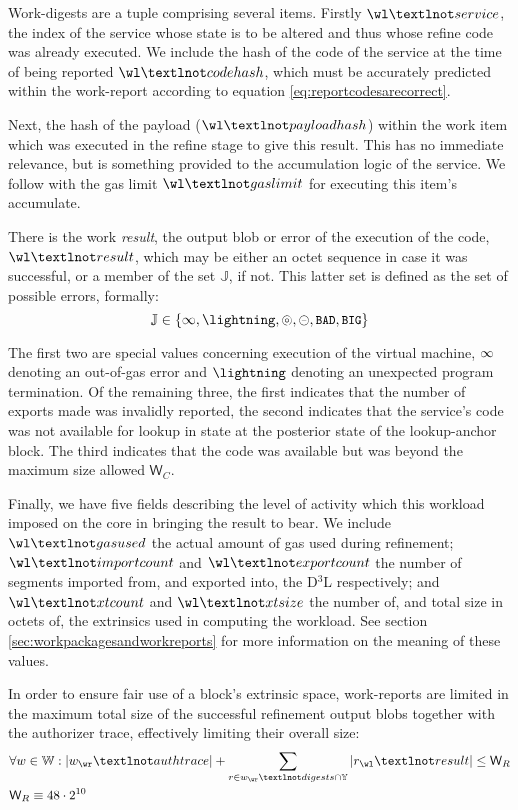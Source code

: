 Work-digests are a tuple comprising several items. Firstly $\wl¬service$, the index of the service whose state is to be altered and thus whose refine code was already executed. We include the hash of the code of the service at the time of being reported $\wl¬codehash$, which must be accurately predicted within the work-report according to equation \ref{eq:reportcodesarecorrect}.

Next, the hash of the payload ($\wl¬payloadhash$) within the work item which was executed in the refine stage to give this result. This has no immediate relevance, but is something provided to the accumulation logic of the service. We follow with the gas limit $\wl¬gaslimit$ for executing this item's accumulate.

There is the work \emph{result}, the output blob or error of the execution of the code, $\wl¬result$, which may be either an octet sequence in case it was successful, or a member of the set $\mathbb{J}$, if not. This latter set is defined as the set of possible errors, formally:
\begin{equation}
  \mathbb{J} \in \{ \oog, \panic, \badexports, \oversize, \token{BAD}, \token{BIG} \}
\end{equation}

The first two are special values concerning execution of the virtual machine, $\infty$ denoting an out-of-gas error and $\panic$ denoting an unexpected program termination. Of the remaining three, the first indicates that the number of exports made was invalidly reported, the second indicates that the service's code was not available for lookup in state at the posterior state of the lookup-anchor block. The third indicates that the code was available but was beyond the maximum size allowed $\mathsf{W}_C$.

Finally, we have five fields describing the level of activity which this workload imposed on the core in bringing the result to bear. We include $\wl¬gasused$ the actual amount of gas used during refinement; $\wl¬importcount$ and $\wl¬exportcount$ the number of segments imported from, and exported into, the D$^3$L respectively; and $\wl¬xtcount$ and $\wl¬xtsize$ the number of, and total size in octets of, the extrinsics used in computing the workload. See section \ref{sec:workpackagesandworkreports} for more information on the meaning of these values.

In order to ensure fair use of a block's extrinsic space, work-reports are limited in the maximum total size of the successful refinement output blobs together with the authorizer trace, effectively limiting their overall size:
\begin{align}
  &\forall w \in \mathbb{W}:
    |w_\wr¬authtrace| + \sum_{r \in w_\wr¬digests \cap \Y} |r_\wl¬result| \le \mathsf{W}_R \\
  &\mathsf{W}_R \equiv 48\cdot2^{10}
\end{align}









